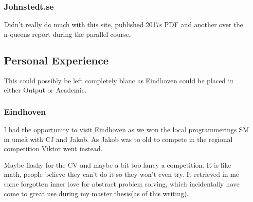 \documentclass[a4paper]{article}
\begin{document}
\subsubsection{Johnstedt.se}

Didn't really do much with this site, published 2017s PDF and another over the n-queens report during the parallel course.

\subsection{Personal Experience}

This could possibly be left completely blanc as Eindhoven could be placed in either Output or Academic.

\subsubsection{Eindhoven}

I had the opportunity to visit Eindhoven as we won the local programmerings SM in umeå with CJ and Jakob. As Jakob was to old to compete in the regional competition Viktor went instead. 

Maybe flashy for the CV and maybe a bit too fancy a competition. It is like math, people believe they can't do it so they won't even try. It retrieved in me some forgotten inner love for abstract problem solving, which incidentally have come to great use during my master thesis(as of this writing). 
\end{document}
